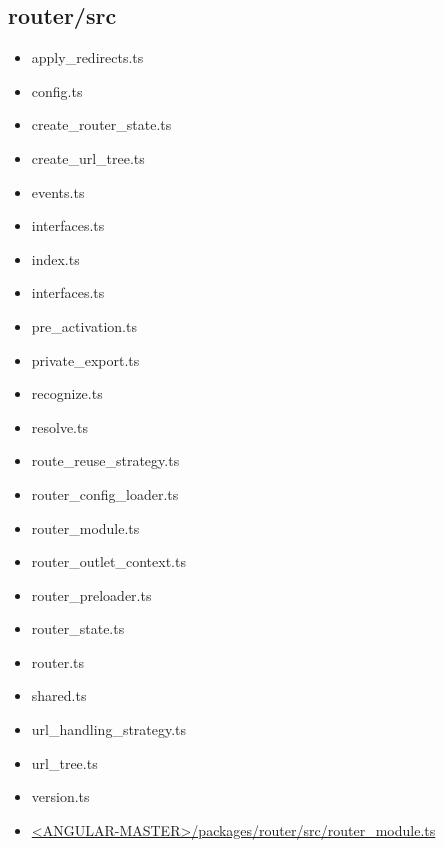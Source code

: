 \subsection{router/src}


\begin{itemize}
  \item apply\_redirects.ts
  \item config.ts
  \item create\_router\_state.ts
  \item create\_url\_tree.ts
  \item events.ts
  \item interfaces.ts
  \item index.ts
  \item interfaces.ts
  \item pre\_activation.ts
  \item private\_export.ts
  \item recognize.ts
  \item resolve.ts
  \item route\_reuse\_strategy.ts
  \item router\_config\_loader.ts
  \item router\_module.ts
  \item router\_outlet\_context.ts
  \item router\_preloader.ts
  \item router\_state.ts
  \item router.ts
  \item shared.ts
  \item url\_handling\_strategy.ts
  \item url\_tree.ts
  \item version.ts
\end{itemize}


\begin{itemize}
  \item \href{https://github.com/angular/angular/blob/master/packages/router/src/router_module.ts}
        {<ANGULAR-MASTER>/packages/router/src/router\_module.ts}
\end{itemize}





